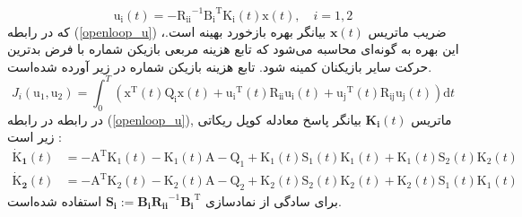 \begin{equation}\label{openloop_u}
	\boldsymbol{\mathrm{u_i}}(t) = -\boldsymbol{\mathrm{R_{ii}}}^{-1}\boldsymbol{\mathrm{B_i}}^\mathrm{T}\boldsymbol{\mathrm{K_{i}}}(t)\boldsymbol{\mathrm{x}}(t),\quad i = 1, 2
\end{equation}
که در رابطه 
(\ref{openloop_u})
،ضریب ماتریس $\boldsymbol{x}(t)$ بیانگر بهره بازخورد بهینه است. این بهره به گونه‌ای محاسبه می‌شود که تابع هزینه مربعی بازیکن شماره  با فرض بدترین حرکت سایر بازیکنان کمینه شود. تابع هزینه بازیکن شماره  در زیر آورده شده‌است.
 \begin{equation}\label{cost}
	J_i( \boldsymbol{\mathrm{u_1}},  \boldsymbol{\mathrm{u_2}}) = \int_{0}^{T}\left( \boldsymbol{\mathrm{x}} ^\mathrm{T}(t) \boldsymbol{\mathrm{Q_i}} \boldsymbol{\mathrm{x}}(t)+
	\boldsymbol{\mathrm{u_i}} ^\mathrm{T}(t) \boldsymbol{\mathrm{R_{ii}}} \boldsymbol{\mathrm{u_i}}(t)+
	\boldsymbol{\mathrm{u_j}} ^\mathrm{T}(t)\boldsymbol{\mathrm{ R_{ij} u_j}}(t)
	\right)\mathrm{d}t
\end{equation}
در رابطه
در رابطه 
(\ref{openloop_u}),
ماتریس $\boldsymbol{K_{i}}(t)$ بیانگر پاسخ معادله کوپل ریكاتی
 زیر است
 \cite{diff_game}:
\begin{equation}\label{coupled_riccatti_LQDG}
\begin{split}
	\boldsymbol{\dot{\mathrm{K}}_1}(t) &= -\boldsymbol{\mathrm{A}}^\mathrm{T}\boldsymbol{\mathrm{K_1}}(t) - \boldsymbol{\mathrm{K_1}}(t)\boldsymbol{\mathrm{A}} - \boldsymbol{\mathrm{Q_1}} +\boldsymbol{\mathrm{K_1}}(t)\boldsymbol{\mathrm{S_1}}(t)\boldsymbol{\mathrm{K_1}}(t) + \boldsymbol{\mathrm{K_1}}(t)\boldsymbol{\mathrm{S_2}}(t)\boldsymbol{\mathrm{K_2}}(t)\\
	\boldsymbol{\dot{\mathrm{K}}_2}(t) &= -\boldsymbol{\mathrm{A}}^\mathrm{T}\boldsymbol{\mathrm{K_2}}(t) - \boldsymbol{\mathrm{K_2}}(t)\boldsymbol{\mathrm{A}} - \boldsymbol{\mathrm{Q_2}} +\boldsymbol{\mathrm{K_2}}(t)\boldsymbol{\mathrm{S_2}}(t)\boldsymbol{\mathrm{K_2}}(t) + \boldsymbol{\mathrm{K_2}}(t)\boldsymbol{\mathrm{S_1}}(t)\boldsymbol{\mathrm{K_1}}(t)
\end{split}
\end{equation}
برای سادگی از نمادسازی
$\boldsymbol{S_i} := \boldsymbol{B_iR_{ii}}^{-1}\boldsymbol{B_i}^\mathrm{T}$
  استفاده شده‌است. 


